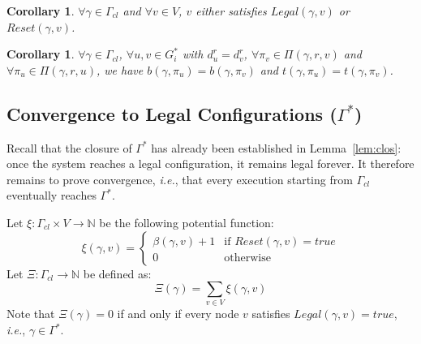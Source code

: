 \documentclass[a4paper, 12pt]{article}
\newtheorem{corollary}[theorem]{Corollary}
\begin{document}
\begin{corollary}
\label{cor:legalReset}
$\forall \gamma \in \Gamma_{cl}$ and $\forall v \in V$, $v$ either 
satisfies $Legal(\gamma, v)$ or $Reset(\gamma, v)$.
\end{corollary}

\begin{corollary}
\label{cor:legalpath}
$\forall \gamma \in \Gamma_{cl}$, $\forall u, v \in G^*_i$ with 
$d^r_u = d^r_v$, $\forall \pi_v \in \Pi(\gamma, r, v)$ and 
$\forall \pi_u \in \Pi(\gamma, r, u)$, we have 
$b(\gamma, \pi_u) = b(\gamma, \pi_v)$ and 
$t(\gamma, \pi_u) = t(\gamma, \pi_v)$.
\end{corollary}
\subsection{Convergence to Legal Configurations ($\Gamma^*$)}
\label{subsec:convergencelegal}

Recall that the closure of $\Gamma^*$ has already been established in 
Lemma~\ref{lem:clos}: once the system reaches a legal configuration, 
it remains legal forever. It therefore remains to prove convergence, 
\textit{i.e.}, that every execution starting from $\Gamma_{cl}$ 
eventually reaches $\Gamma^*$.



Let $\xi : \Gamma_{cl} \times V \rightarrow \mathbb{N}$ be the 
following potential function:
\begin{equation}
    \xi(\gamma, v) =
    \begin{cases}
        \beta(\gamma, v) + 1 & \text{if } Reset(\gamma, v) = 
        \mathit{true}\\
        0 & \text{otherwise}
    \end{cases}
\end{equation}
Let $\Xi : \Gamma_{cl} \rightarrow \mathbb{N}$ be defined as:
\begin{equation}
    \Xi(\gamma) = \sum_{v \in V} \xi(\gamma, v)
\end{equation}
Note that $\Xi(\gamma) = 0$ if and only if every node $v$ satisfies 
$Legal(\gamma, v) = \mathit{true}$, \textit{i.e.}, $\gamma \in \Gamma^*$.
\end{document}
